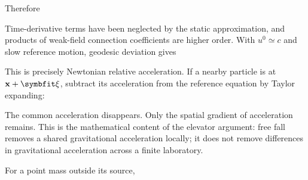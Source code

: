 \documentclass[
  11pt,
  letterpaper,
  oneside,
  openany]{scrbook}
\begin{document}
Therefore

\begin{center}
\begingroup
{}
\ifdim\wd\grmathbox>\linewidth
\resizebox{\linewidth}{!}{\usebox{\grmathbox}}
\else\usebox{\grmathbox}\fi
\endgroup
\end{center}

Time-derivative terms have been neglected by the static approximation,
and products of weak-field connection coefficients are higher order.
With \(u^0\simeq c\) and slow reference motion, geodesic deviation gives

\begin{center}
\begingroup
{}
\ifdim\wd\grmathbox>\linewidth
\resizebox{\linewidth}{!}{\usebox{\grmathbox}}
\else\usebox{\grmathbox}\fi
\endgroup
\end{center}

This is precisely Newtonian relative acceleration. If a nearby particle
is at \(\mathbf x+\symbfit\xi\), subtract its acceleration from the
reference equation by Taylor expanding:

\begin{center}
\begingroup
{}
\ifdim\wd\grmathbox>\linewidth
\resizebox{\linewidth}{!}{\usebox{\grmathbox}}
\else\usebox{\grmathbox}\fi
\endgroup
\end{center}

The common acceleration disappears. Only the spatial gradient of
acceleration remains. This is the mathematical content of the elevator
argument: free fall removes a shared gravitational acceleration locally;
it does not remove differences in gravitational acceleration across a
finite laboratory.

For a point mass outside its source,

\begin{center}
\begingroup
{}
\ifdim\wd\grmathbox>\linewidth
\resizebox{\linewidth}{!}{\usebox{\grmathbox}}
\else\usebox{\grmathbox}\fi
\endgroup
\end{center}
\end{document}
